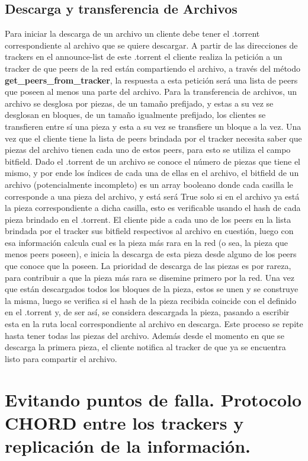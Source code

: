 \documentclass[article]{llncs}
\begin{document}
\subsection{Descarga y transferencia de Archivos}
Para iniciar la descarga de un archivo un cliente debe tener el .torrent correspondiente al archivo que se quiere descargar. A partir de 
las direcciones de trackers en el announce-list de este .torrent el cliente realiza la petición a un tracker de que peers de la red 
están compartiendo el archivo, a través del método \textbf{get\_peers\_from\_tracker}, la respuesta a esta petición será una lista de 
peers que poseen al menos una parte del archivo. Para la transferencia de archivos, un archivo se desglosa por piezas, de un tamaño 
prefijado, y estas a su vez se desglosan en bloques, de un tamaño igualmente prefijado, los clientes se transfieren entre sí una pieza y esta 
a su vez se transfiere un bloque a la vez. Una vez que el cliente tiene la lista de peers brindada por el tracker necesita saber que piezas del archivo 
tienen cada uno de estos peers, para esto se utiliza el campo bitfield. Dado el .torrent de un archivo se conoce el número de piezas que tiene el mismo, 
y por ende los índices de cada una de ellas en el archivo, el bitfield de un archivo (potencialmente incompleto) es un array booleano donde cada 
casilla le corresponde a una pieza del archivo, y está será True solo si en el archivo ya está la pieza correspondiente a dicha casilla, esto es 
verificable usando el hash de cada pieza brindado en el .torrent. El cliente pide a cada uno de los peers en la lista brindada por el 
tracker sus bitfield respectivos al archivo en cuestión, luego con esa información calcula cual es la pieza más rara en la red (o sea, la pieza que 
menos peers poseen), e inicia la descarga de esta pieza desde alguno de los peers que conoce que la poseen. La prioridad de descarga de las piezas es 
por rareza, para contribuir a que la pieza más rara se disemine primero por la red. Una vez que están descargados todos los bloques 
de la pieza, estos se unen y se construye la misma, luego se verifica si el hash de la pieza recibida coincide con el definido en el .torrent y, 
de ser así, se considera descargada la pieza, pasando a escribir esta en la ruta local correspondiente al archivo en descarga. Este proceso se repite hasta 
tener todas las piezas del archivo. Además desde el momento en que se descarga la primera pieza, el cliente notifica al tracker de que ya se encuentra listo para 
compartir el archivo.


\section{Evitando puntos de falla. Protocolo CHORD entre los trackers y replicación de la información.}
\end{document}
